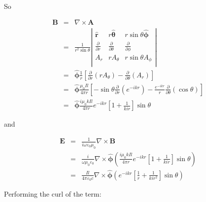 \documentclass[a4paper,11pt]{report}
\begin{document}
So

\begin{eqnarray} \label{get_B_hd}
\mathbf{B}&=&\nabla \times \mathbf{A} \\
&=&\frac{1}{r^2 \sin \theta}\left|%
\begin{array}{ccc}
 \mathbf{ \hat{r}} & r\mathbf{\hat{\theta}} & r \sin \theta \mathbf{\hat{\phi}} \\
  \frac{\partial }{\partial r} & \frac{\partial }{\partial \theta } & \frac{\partial }{\partial \phi } \\
  A_r & rA_{\theta } & r \sin \theta A_{\phi} \\
\end{array}%
\right|\\
&=&\mathbf{ \hat{\phi}} \frac{1}{r} \left[ \frac{\partial }{\partial r} \left( rA_\theta \right) - \frac{\partial }{\partial \theta } (A_r)\right] \nonumber \\
&=& \mathbf{\hat{\phi}}\frac{\mu_0 I l}{4 \pi r} \left[ -\sin \theta \frac{\partial }{\partial r} \left(   e^{-ikr } \right) - \frac{e^{-ikr }}{r} \frac{\partial }{\partial \theta } (\cos \theta )\right] \nonumber \\
&=& \mathbf{\hat{\phi}} \frac{i \mu_0 k I l}{4 \pi r} e^{-ikr } \left[ 1+ \frac{1}{kir}\right] \sin \theta \nonumber
\end{eqnarray}

and

\begin{eqnarray} \label{get_E_hd}
\mathbf{E}&=& \frac{1}{i\omega \varepsilon_0 \mu_0} \nabla \times \mathbf{B} \\
&=&\frac{i}{ \omega \mu_0 \varepsilon_0} \nabla \times\mathbf{ \hat{\phi}} \left( \frac{i \mu_0 k I l}{4 \pi r} e^{-ikr } \left[ 1+ \frac{1}{kir}\right] \sin \theta \right) \\
&=&\frac{  I l}{4 \pi \varepsilon_0 c} \nabla \times \mathbf{\hat{\phi}} \left( e^{-ikr } \left[  \frac{ 1}{ r}+ \frac{1}{kir^2}\right] \sin \theta \right)
\end{eqnarray}

Performing the curl of the term:
\end{document}
